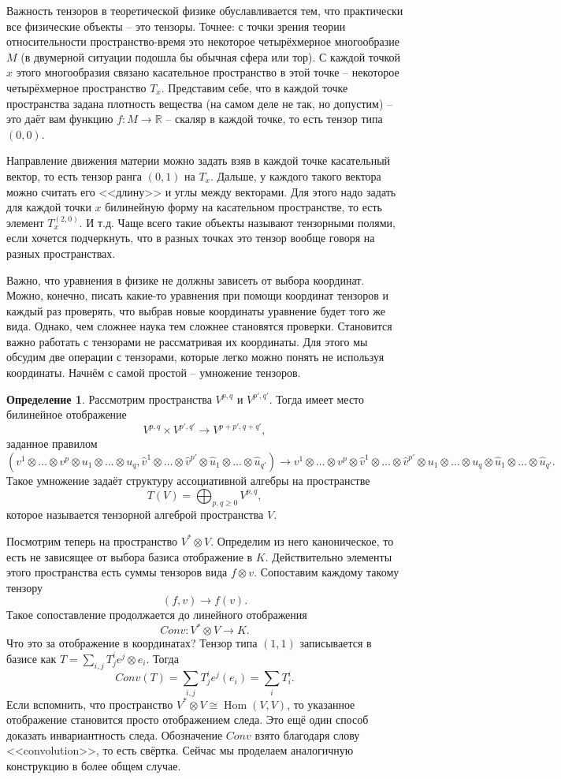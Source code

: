 \documentclass[10pt,a4paper,oneside]{book}
\theoremstyle{definition}
\newtheorem*{defn}{{\color{yellow!20!red} Определение}}
\newcommand{\mb}[1]{\mathbb{#1}}
\newcommand{\Hom}{\operatorname{Hom}}
\def\dfn{\begin{defn}}
\def\edfn{\end{defn}}
\begin{document}
Важность тензоров в теоретической физике обуславливается тем, что практически все физические объекты -- это тензоры. Точнее: с точки зрения теории относительности пространство-время это некоторое четырёхмерное многообразие $M$ (в двумерной ситуации подошла бы обычная сфера или тор). С каждой точкой $x$ этого многообразия связано касательное пространство в этой точке -- некоторое четырёхмерное пространство $T_x$. Представим себе, что в каждой точке пространства задана плотность вещества (на самом деле не так, но допустим) -- это даёт вам функцию $f \colon M \to \mb R$ -- скаляр в каждой точке, то есть тензор типа $(0,0)$. 

Направление движения материи можно задать взяв в каждой точке касательный вектор, то есть тензор ранга $(0,1)$ на $T_x$. Дальше, у каждого такого вектора можно считать его <<длину>> и углы между векторами. Для этого надо задать для каждой точки $x$ билинейную форму на касательном пространстве, то есть элемент $T_x^{(2,0)}$. И т.д. Чаще всего такие объекты называют тензорными полями, если хочется подчеркнуть, что в разных точках это тензор вообще говоря на разных пространствах.

Важно, что уравнения в физике не должны зависеть от выбора координат. Можно, конечно, писать какие-то уравнения при помощи координат тензоров и каждый раз проверять, что выбрав новые координаты уравнение будет того же вида. Однако, чем сложнее наука тем сложнее становятся проверки. Становится важно работать с тензорами не рассматривая их координаты. Для этого мы обсудим две операции с тензорами, которые легко можно понять не используя координаты. Начнём с самой простой -- умножение тензоров.

\dfn Рассмотрим пространства $V^{p,q}$ и $V^{p',q'}$. Тогда имеет место билинейное отображение $$V^{p,q}\times V^{p',q'} \to V^{p+p',q+q'},$$
заданное правилом 
$$(v^1\otimes\dots\otimes v^p\otimes u_1\otimes\dots \otimes u_q,\hat{v}^1\otimes\dots\otimes \hat{v}^{p'}\otimes \hat{u}_1\otimes\dots \otimes \hat{u}_{q'}) \to v^1\otimes\dots\otimes v^p\otimes \hat{v}^1\otimes\dots\otimes \hat{v}^{p'}\otimes u_1\otimes\dots \otimes u_q \otimes \hat{u}_1\otimes\dots \otimes \hat{u}_{q'}.$$
Такое умножение задаёт структуру ассоциативной алгебры на пространстве 
$$T(V)=\bigoplus_{p,q\geq 0} V^{p,q},$$
которое называется тензорной алгеброй пространства $V$.
\edfn

Посмотрим теперь на пространство $V^*\otimes V$. Определим из него каноническое, то есть не зависящее от выбора базиса отображение в $K$. Действительно элементы этого пространства есть суммы тензоров вида $f\otimes v$. Сопоставим каждому такому тензору 
$$(f,v) \to f(v).$$
Такое сопоставление продолжается до линейного отображения $$Conv \colon V^*\otimes V \to K.$$
Что это за отображение в координатах? Тензор типа $(1,1)$ записывается в базисе как $T=\sum_{i,j} T_j^i e^j\otimes e_i$. Тогда $$Conv(T)=\sum_{i,j} T_j^i e^j(e_i)=\sum_i T^i_i.$$
Если вспомнить, что пространство $V^*\otimes V \cong \Hom(V,V)$, то указанное отображение становится просто отображением следа. Это ещё один способ доказать инвариантность следа. Обозначение $Conv$ взято благодаря слову <<convolution>>, то есть свёртка. Сейчас мы проделаем аналогичную конструкцию в более общем случае. 
\end{document}
